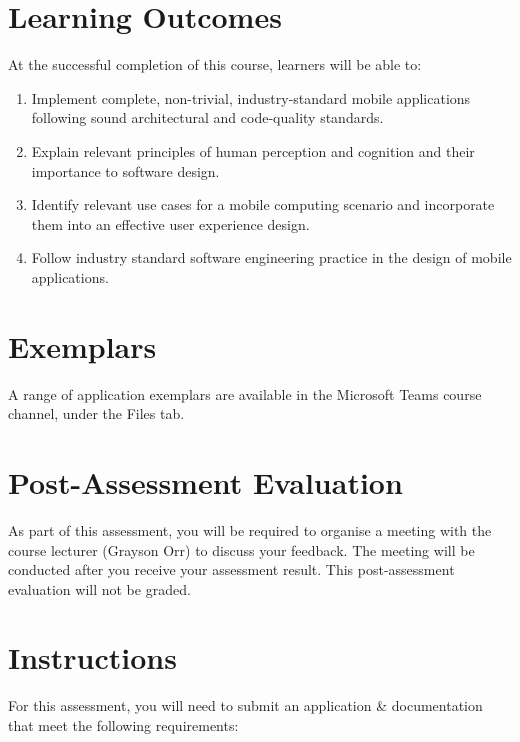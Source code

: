 \documentclass{article}
\begin{document}
\section*{Learning Outcomes}
At the successful completion of this course, learners will be able to:
\begin{enumerate}
	\item Implement complete, non-trivial, industry-standard mobile applications following sound architectural and code-quality standards.
	\item Explain relevant principles of human perception and cognition and their importance to software design.
	\item Identify relevant use cases for a mobile computing scenario and incorporate them into an effective user experience design.
	\item Follow industry standard software engineering practice in the design of mobile applications.
\end{enumerate}

\section*{Exemplars}
A range of application exemplars are available in the Microsoft Teams course channel, under the Files tab.

\section*{Post-Assessment Evaluation}
As part of this assessment, you will be required to organise a meeting with the course lecturer (Grayson Orr) to discuss your feedback. The meeting will be conducted after you receive your assessment result. This post-assessment evaluation will not be graded.

\newpage

\section*{Instructions} 
For this assessment, you will need to submit an application \& documentation that meet the following requirements:
\end{document}
